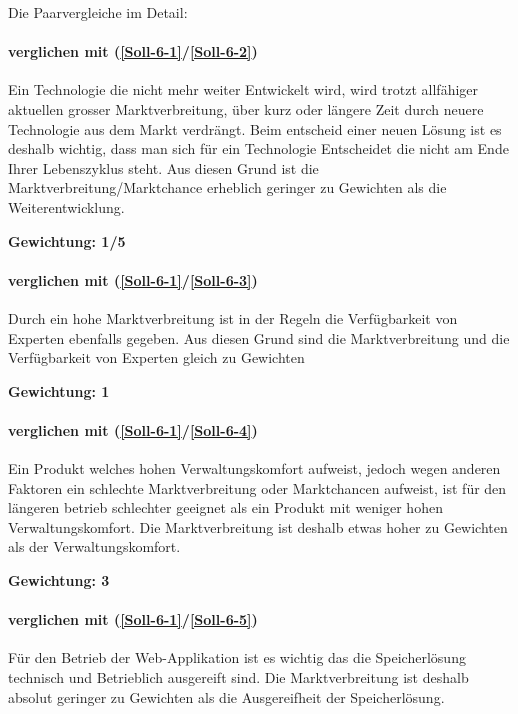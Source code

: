 Die Paarvergleiche im Detail:


\paragraph*{ verglichen mit  (\ref{Soll-6-1}/\ref{Soll-6-2})} Ein Technologie die nicht mehr weiter Entwickelt wird, wird trotzt allfähiger aktuellen grosser Marktverbreitung, über kurz oder längere Zeit durch neuere Technologie aus dem Markt verdrängt. Beim entscheid einer neuen Lösung ist es deshalb wichtig, dass man sich für ein Technologie Entscheidet die nicht am Ende Ihrer Lebenszyklus steht. Aus diesen Grund ist die Marktverbreitung/Marktchance erheblich geringer zu Gewichten als die Weiterentwicklung.

\textbf{Gewichtung: 1/5}


\paragraph*{ verglichen mit  (\ref{Soll-6-1}/\ref{Soll-6-3})}
Durch ein hohe Marktverbreitung ist in der Regeln die Verfügbarkeit von Experten ebenfalls gegeben. Aus diesen Grund sind die Marktverbreitung und die Verfügbarkeit von Experten gleich zu Gewichten

\textbf{Gewichtung: 1}

\paragraph*{ verglichen mit  (\ref{Soll-6-1}/\ref{Soll-6-4})}
Ein Produkt welches hohen Verwaltungskomfort aufweist, jedoch wegen anderen Faktoren ein schlechte Marktverbreitung oder Marktchancen aufweist, ist für den längeren betrieb schlechter geeignet als ein Produkt mit weniger hohen Verwaltungskomfort. Die Marktverbreitung ist deshalb etwas hoher zu Gewichten als der Verwaltungskomfort.

\textbf{Gewichtung: 3}

\paragraph*{ verglichen mit  (\ref{Soll-6-1}/\ref{Soll-6-5})}
Für den Betrieb der Web-Applikation ist es wichtig das die Speicherlösung technisch und Betrieblich ausgereift sind. Die Marktverbreitung ist deshalb absolut geringer zu Gewichten als die Ausgereifheit der Speicherlösung.

